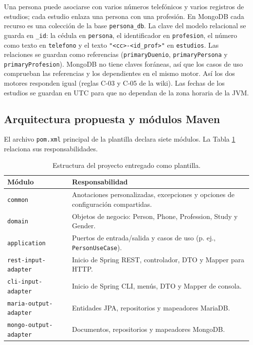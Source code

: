 \documentclass[11pt,a4paper]{article}
\begin{document}
Una persona puede asociarse con varios números telefónicos y varios registros
de estudios; cada estudio enlaza una persona con una profesión. En MongoDB cada
recurso es una colección de la base \texttt{persona\_db}. La clave del modelo
relacional se guarda en \texttt{\_id}: la cédula en \texttt{persona}, el
identificador en \texttt{profesion}, el número como texto en \texttt{telefono} y
el texto \texttt{"<cc>-<id\_prof>"} en \texttt{estudios}. Las relaciones se guardan
como referencias (\texttt{primaryDuenio}, \texttt{primaryPersona} y
\texttt{primaryProfesion}). MongoDB no tiene claves foráneas, así que los casos de
uso comprueban las referencias y los dependientes en el mismo motor. Así los dos
motores responden igual (reglas C-03 y C-05 de la wiki). Las fechas de los
estudios se guardan en UTC para que no dependan de la zona horaria de la JVM.

\subsection{Arquitectura propuesta y módulos Maven}
El archivo \texttt{pom.xml} principal de la plantilla declara siete módulos.
La Tabla \ref{tab:modulos} relaciona sus responsabilidades.

\begin{table}[H]
\centering\small
\begin{tabularx}{\textwidth}{@{}p{4.0cm}X@{}}
\toprule
\textbf{Módulo}&\textbf{Responsabilidad}\\\midrule
\texttt{common}&Anotaciones personalizadas, excepciones y opciones de configuración compartidas.\\
\texttt{domain}&Objetos de negocio: Person, Phone, Profession, Study y Gender.\\
\texttt{application}&Puertos de entrada/salida y casos de uso (p. ej., \texttt{PersonUseCase}).\\
\texttt{rest-input-adapter}&Inicio de Spring REST, controlador, DTO y Mapper para HTTP.\\
\texttt{cli-input-adapter}&Inicio de Spring CLI, menús, DTO y Mapper de consola.\\
\texttt{maria-output-adapter}&Entidades JPA, repositorios y mapeadores MariaDB.\\
\texttt{mongo-output-adapter}&Documentos, repositorios y mapeadores MongoDB.\\
\bottomrule
\end{tabularx}
\caption{Estructura del proyecto entregado como plantilla.}
\label{tab:modulos}
\end{table}
\end{document}
